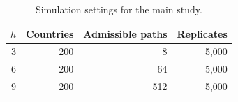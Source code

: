 \begin{table}[htbp]
\centering
\caption{Simulation settings for the main study.}
\label{tab:sim-settings}
\begin{tabular}{rrrr}
\toprule
$h$ & Countries & Admissible paths & Replicates \\
\midrule
3 & 200 & 8   & 5,000 \\
6 & 200 & 64  & 5,000 \\
9 & 200 & 512 & 5,000 \\
\bottomrule
\end{tabular}
\end{table}
